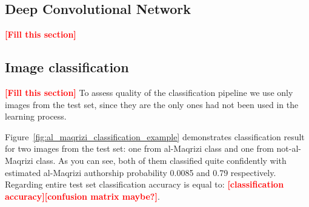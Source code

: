 \documentclass[conference,a4paper,twocolumn]{IEEEtran}
\newcommand{\todo}[1]{\textcolor{red}{\textbf{[#1]}}} %
\begin{document}
\subsection{Deep Convolutional Network}
\todo{Fill this section}

\subsection{Image classification}
\todo{Fill this section}
To assess quality of the classification pipeline we use only images from the test set, since they are the only ones had not been used in the learning process. 

Figure~\ref{fig:al_maqrizi_classification_example} demonstrates classification result for two images from the test set: one from al-Maqrizi class and one from not-al-Maqrizi class. As you can see, both of them classified quite confidently with estimated al-Maqrizi authorship probability 0.0085 and 0.79 respectively. Regarding entire test set classification accuracy is equal to: \todo{classification accuracy}\todo{confusion matrix maybe?}.



\end{document}
